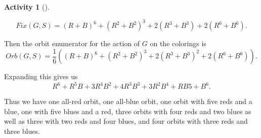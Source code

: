 \documentclass[10pt,]{book}
\theoremstyle{plain}
\theoremstyle{definition}
\newtheorem{activity}[project]{Activity}
\numberwithin{equation}{chapter}
\begin{document}
\begin{activity}[]
\begin{enumerate}[label=(\alph*)]
\begin{equation*}
{ Fix}(G,S)= (R+B)^6 +(R^2+B^2)^3 +2(R^3+B^3) + 2(R^6+B^6).
\end{equation*}
%
\par
Then the orbit enumerator for the action of \(G\) on the colorings is%
\begin{equation*}
{ Orb}(G,S)=\frac{1}{6}\left((R+B)^6 +(R^2+B^2)^3 +2(R^3+B^3)^2 +
2(R^6+B^6)\right).
\end{equation*}
%
\par
Expanding this gives us%
\begin{equation*}
R^6+R^5B+3R^4B^2+4R^3B^3+3R^2B^4+RB5+B^6.
\end{equation*}
%
\par
Thus we have one all-red orbit, one all-blue orbit, one orbit with five reds and a blue, one with five blues and a red, three orbits with four reds and two blues as well as three with two reds and four blues, and four orbits with three reds and three blues.%


\end{enumerate}
\end{activity}
\end{document}
